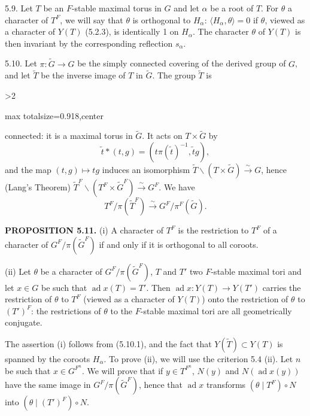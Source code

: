 \documentclass[9pt,twoside]{extarticle}
\newcommand{\EditionPage}[3]{%
  \ifnum#1>2\clearpage\fi
  \pdfbookmark[1]{Printed page #2}{en-folio-#2}%
  \hypertarget{en-physical-#1}{}%
  \noindent\begin{adjustbox}{max totalsize={\textwidth}{0.918\textheight},center}
  \begin{minipage}[t]{\textwidth}
  \fontsize{9.4}{11.1}\selectfont\justifying
  #3
  \end{minipage}
  \end{adjustbox}%
}
\begin{document}
{5.9. Let \(T\) be an \(F\)-stable maximal torus in \(G\) and let \(\alpha\) be a root of \(T\). For \(\theta\) a character of \(T^F\), we will say that \(\theta\) is orthogonal to \(H_\alpha\): \(\langle H_\alpha,\theta\rangle=0\) if \(\theta\), viewed as a character of \(Y(T)\) (5.2.3), is identically 1 on \(H_\alpha\). The character \(\theta\) of \(Y(T)\) is then invariant by the corresponding reflection \(s_\alpha\).\par

5.10. Let \(\pi:\widetilde G\to G\) be the simply connected covering of the derived group of \(G\), and let \(\widetilde T\) be the inverse image of \(T\) in \(\widetilde G\). The group \(\widetilde T\) is\par
}

\EditionPage{29}{130}{%
connected: it is a maximal torus in \(\widetilde G\). It acts on \(T\times\widetilde G\) by \[
\widetilde t*(t,g)=(t\pi(\widetilde t)^{-1},\widetilde t g),
\] and the map \((t,g)\mapsto tg\) induces an isomorphism \(\widetilde T\backslash(T\times\widetilde G)\xrightarrow{\sim}G\), hence (Lang's Theorem) \(\widetilde T^F\backslash(T^F\times\widetilde G^F)\xrightarrow{\sim}G^F\). We have \[
\tag{5.10.1}
T^F/\pi(\widetilde T^F)\xrightarrow{\sim}G^F/\pi^F(\widetilde G).
\]\par

\noindent\textbf{PROPOSITION 5.11.} (i) A character of \(T^F\) is the restriction to \(T^F\) of a character of \(G^F/\pi(\widetilde G^F)\) if and only if it is orthogonal to all coroots.\par

(ii) Let \(\theta\) be a character of \(G^F/\pi(\widetilde G^F)\), \(T\) and \(T'\) two \(F\)-stable maximal tori and let \(x\in G\) be such that \(\operatorname{ad}x(T)=T'\). Then \(\operatorname{ad}x:Y(T)\to Y(T')\) carries the restriction of \(\theta\) to \(T^F\) (viewed as a character of \(Y(T)\)) onto the restriction of \(\theta\) to \((T')^F\): the restrictions of \(\theta\) to the \(F\)-stable maximal tori are all geometrically conjugate.\par

The assertion (i) follows from (5.10.1), and the fact that \(Y(\widetilde T)\subset Y(T)\) is spanned by the coroots \(H_\alpha\). To prove (ii), we will use the criterion 5.4 (ii). Let \(n\) be such that \(x\in G^{F^n}\). We will prove that if \(y\in T^{F^n}\), \(N(y)\) and \(N(\operatorname{ad}x(y))\) have the same image in \(G^F/\pi(\widetilde G^F)\), hence that \(\operatorname{ad}x\) transforms \((\theta\mid T^F)\circ N\) into \((\theta\mid(T')^F)\circ N\).\par

}
\end{document}
